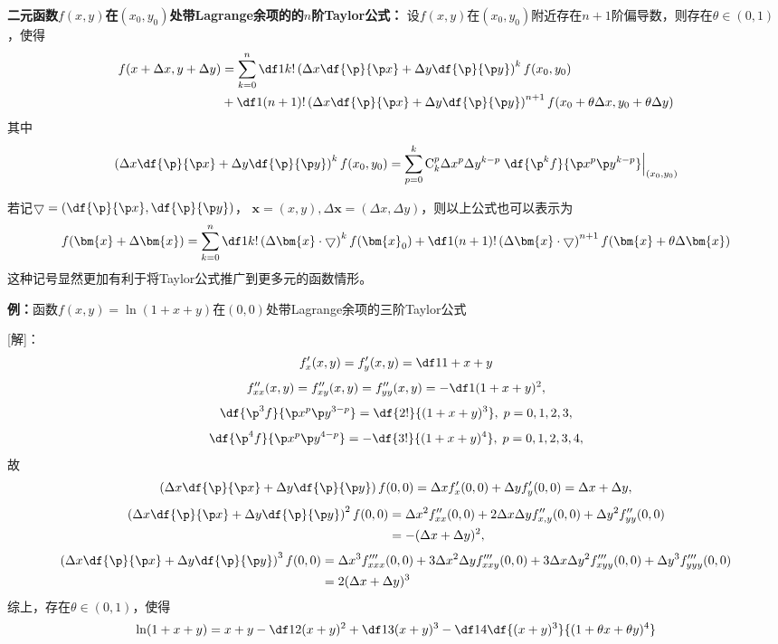 \begin{shaded}
	{\bf 二元函数$f(x,y)$在$(x_0,y_0)$处带Lagrange余项的的$n$阶Taylor公式：}
	设$f(x,y)$在$(x_0,y_0)$附近存在$n+1$阶偏导数，则存在$\theta\in(0,1)$，使得
	\begin{align*}
		f(x+\Delta x,y+\Delta y)&=\sum\limits_{k=0}^n
		\df1{k!}\left(\Delta x\df{\p}{\p x}+\Delta y\df{\p}{\p y}\right)^kf(x_0,y_0)\\
		&+\df1{(n+1)!}\left(\Delta x\df{\p}{\p x}+\Delta y\df{\p}{\p y}\right)
		^{n+1}f(x_0+\theta\Delta x,y_0+\theta\Delta y)
	\end{align*}
	其中
	$$\left(\Delta x\df{\p}{\p x}+\Delta y\df{\p}{\p y}\right)^kf(x_0,y_0)
	=\sum\limits_{p=0}^k\mathrm{C}_k^p\Delta x^p\Delta y^{k-p}
	\left.\df{\p^kf}{\p x^p\p y^{k-p}}\right|_{(x_0,y_0)}$$
	
	若记$\bigtriangledown=\left(\df{\p}{\p x},\df{\p}{\p y}\right)$，
	$\bm{x}=(x,y),\Delta\bm{x}=(\Delta x,\Delta y)$，则以上公式也可以表示为
	$$f(\bm{x}+\Delta\bm{x})=\sum\limits_{k=0}^n
	\df1{k!}\left(\Delta\bm{x}
	\cdot\bigtriangledown\right)^kf(\bm{x}_0)+\df1{(n+1)!}
	\left(\Delta\bm{x}\cdot\bigtriangledown\right)^{n+1}f(
	\bm{x}+\theta\Delta\bm{x})$$
	这种记号显然更加有利于将Taylor公式推广到更多元的函数情形。
	
	{\bf 例：}函数$f(x,y)=\ln(1+x+y)$在$(0,0)$处带Lagrange余项的三阶Taylor公式
	
	[解]：
	$$f'_x(x,y)=f'_y(x,y)=\df1{1+x+y}$$
	$$f''_{xx}(x,y)=f''_{xy}(x,y)=f''_{yy}(x,y)=-\df1{(1+x+y)^2},$$
	$$\df{\p^3f}{\p x^p\p y^{3-p}}=\df{2!}{(1+x+y)^3},\;p=0,1,2,3,$$
	$$\df{\p^4f}{\p x^p\p y^{4-p}}=-\df{3!}{(1+x+y)^4},\;p=0,1,2,3,4,$$
	故
	$$\left(\Delta x\df{\p}{\p x}+\Delta y\df{\p}{\p y}\right)f(0,0)
	=\Delta xf'_x(0,0)+\Delta yf'_y(0,0)
	=\Delta x+\Delta y,$$
	\begin{align*}
		\left(\Delta x\df{\p}{\p x}+\Delta y\df{\p}{\p y}\right)^2f(0,0)
		&=\Delta x^2f''_{xx}(0,0)+2\Delta x\Delta yf''_{x,y}(0,0)
		+\Delta y^2f''_{yy}(0,0)\\
		&=-(\Delta x+\Delta y)^2,
	\end{align*}
	\begin{align*}
		\left(\Delta x\df{\p}{\p x}+\Delta y\df{\p}{\p y}\right)^3f(0,0)
		&=\Delta x^3f'''_{xxx}(0,0)+3\Delta x^2\Delta yf'''_{xxy}(0,0)
		+3\Delta x\Delta y^2f'''_{xyy}(0,0)+\Delta y^3f'''_{yyy}(0,0)\\
		&=2(\Delta x+\Delta y)^3
	\end{align*}
	综上，存在$\theta\in(0,1)$，使得
	$$\ln(1+x+y)=x+y-\df12(x+y)^2+\df13(x+y)^3-\df14\df{(x+y)^3}
	{(1+\theta x+\theta y)^4}$$
\end{shaded}

